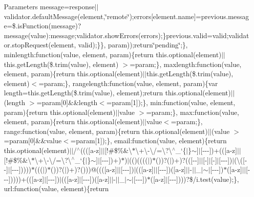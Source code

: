 \begin{DoxyParams}{Parameters}
message=response$\vert$$\vert$validator.default\+Message(element,\char`\"{}remote\char`\"{});errors\mbox{[}element.\+name\mbox{]}=previous.\+message=\$.is\+Function(message)?message(value)\+:message;validator.\+show\+Errors(errors);\}previous.\+valid=valid;validator.\+stop\+Request(element, valid);\}\}, param));return\char`\"{}pending\char`\"{};\}, minlength\+:function(value, element, param)\{return this.\+optional(element)$\vert$$\vert$this.get\+Length(\$.trim(value), element) $>$=param;\}, maxlength\+:function(value, element, param)\{return this.\+optional(element)$\vert$$\vert$this.get\+Length(\$.trim(value), element)$<$=param;\}, rangelength\+:function(value, element, param)\{var length=this.\+get\+Length(\$.trim(value), element);return this.\+optional(element)$\vert$$\vert$(length $>$=param\mbox{[}0\mbox{]}\&\&length$<$=param\mbox{[}1\mbox{]});\}, min\+:function(value, element, param)\{return this.\+optional(element)$\vert$$\vert$value $>$=param;\}, max\+:function(value, element, param)\{return this.\+optional(element)$\vert$$\vert$value$<$=param;\}, range\+:function(value, element, param)\{return this.\+optional(element)$\vert$$\vert$(value $>$=param\mbox{[}0\mbox{]}\&\&value$<$=param\mbox{[}1\mbox{]});\}, email\+:function(value, element)\{return this.\+optional(element)$\vert$$\vert$/$^\wedge$(((\mbox{[}a-\/z\mbox{]}$\vert$$\vert$\mbox{[}!\#\$\%\&\textquotesingle{}\textbackslash{}$\ast$\textbackslash{}+\textbackslash{}-\/\textbackslash{}/=\textbackslash{}?\textbackslash{}$^\wedge$\+\_\+`\{$|$\}$\sim$\mbox{]}$\vert$\mbox{[}-\/-\/-\/\mbox{]})+((\mbox{[}a-\/z\mbox{]}$\vert$$\vert$\mbox{[}!\#\$\%\&\textquotesingle{}\textbackslash{}$\ast$\textbackslash{}+\textbackslash{}-\/\textbackslash{}/=\textbackslash{}?\textbackslash{}$^\wedge$\+\_\+`\{$|$\}$\sim$\mbox{]}$\vert$\mbox{[}-\/-\/-\/\mbox{]})+)$\ast$)$\vert$(()(((($\vert$)$\ast$())?($\vert$)+)?((\mbox{[}-\/-\/\mbox{]}$\vert$$\vert$\mbox{[}-\/\mbox{]}$\vert$\mbox{[}-\/\mbox{]}$\vert$\mbox{[}-\/-\/-\/\mbox{]})$\vert$(\textbackslash{}(\mbox{[}-\/-\/\mbox{]}$\vert$\mbox{[}-\/-\/-\/\mbox{]}))))$\ast$((($\vert$)$\ast$())?($\vert$)+)?()))@(((\mbox{[}a-\/z\mbox{]}$\vert$$\vert$\mbox{[}-\/-\/-\/\mbox{]})$\vert$((\mbox{[}a-\/z\mbox{]}$\vert$$\vert$\mbox{[}-\/-\/-\/\mbox{]})(\mbox{[}a-\/z\mbox{]}$\vert$$\vert$-\/$\vert$$\vert$\+\_\+$\vert$$\sim$$\vert$\mbox{[}-\/-\/-\/\mbox{]})$\ast$(\mbox{[}a-\/z\mbox{]}$\vert$$\vert$\mbox{[}-\/-\/-\/\mbox{]}))))+((\mbox{[}a-\/z\mbox{]}$\vert$\mbox{[}-\/-\/-\/\mbox{]})$\vert$((\mbox{[}a-\/z\mbox{]}$\vert$\mbox{[}-\/-\/-\/\mbox{]})(\mbox{[}a-\/z\mbox{]}$\vert$$\vert$-\/$\vert$$\vert$\+\_\+$\vert$$\sim$$\vert$\mbox{[}-\/-\/-\/\mbox{]})$\ast$(\mbox{[}a-\/z\mbox{]}$\vert$\mbox{[}-\/-\/-\/\mbox{]})))?\$/i.test(value);\}, url\+:function(value, element)\{return 
\end{DoxyParams}

